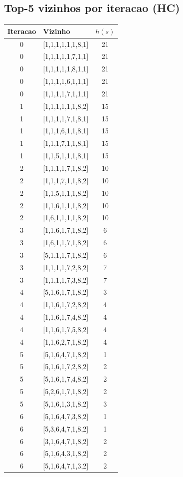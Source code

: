 \subsection{Top-5 vizinhos por iteracao (HC)}
\begingroup
\scriptsize
\begin{longtable}{c p{4.7cm} c}
\toprule
Iteracao & Vizinho & $h(s)$ \\
\midrule
0 & [1,1,1,1,1,1,8,1] & 21 \\
0 & [1,1,1,1,1,7,1,1] & 21 \\
0 & [1,1,1,1,1,8,1,1] & 21 \\
0 & [1,1,1,1,6,1,1,1] & 21 \\
0 & [1,1,1,1,7,1,1,1] & 21 \\
1 & [1,1,1,1,1,1,8,2] & 15 \\
1 & [1,1,1,1,7,1,8,1] & 15 \\
1 & [1,1,1,6,1,1,8,1] & 15 \\
1 & [1,1,1,7,1,1,8,1] & 15 \\
1 & [1,1,5,1,1,1,8,1] & 15 \\
2 & [1,1,1,1,7,1,8,2] & 10 \\
2 & [1,1,1,7,1,1,8,2] & 10 \\
2 & [1,1,5,1,1,1,8,2] & 10 \\
2 & [1,1,6,1,1,1,8,2] & 10 \\
2 & [1,6,1,1,1,1,8,2] & 10 \\
3 & [1,1,6,1,7,1,8,2] & 6 \\
3 & [1,6,1,1,7,1,8,2] & 6 \\
3 & [5,1,1,1,7,1,8,2] & 6 \\
3 & [1,1,1,1,7,2,8,2] & 7 \\
3 & [1,1,1,1,7,3,8,2] & 7 \\
4 & [5,1,6,1,7,1,8,2] & 3 \\
4 & [1,1,6,1,7,2,8,2] & 4 \\
4 & [1,1,6,1,7,4,8,2] & 4 \\
4 & [1,1,6,1,7,5,8,2] & 4 \\
4 & [1,1,6,2,7,1,8,2] & 4 \\
5 & [5,1,6,4,7,1,8,2] & 1 \\
5 & [5,1,6,1,7,2,8,2] & 2 \\
5 & [5,1,6,1,7,4,8,2] & 2 \\
5 & [5,2,6,1,7,1,8,2] & 2 \\
5 & [5,1,6,1,3,1,8,2] & 3 \\
6 & [5,1,6,4,7,3,8,2] & 1 \\
6 & [5,3,6,4,7,1,8,2] & 1 \\
6 & [3,1,6,4,7,1,8,2] & 2 \\
6 & [5,1,6,4,3,1,8,2] & 2 \\
6 & [5,1,6,4,7,1,3,2] & 2 \\
\bottomrule
\end{longtable}
\endgroup

